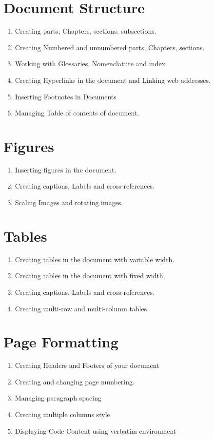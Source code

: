 \documentclass[11pt,a4paper]{article}
\begin{document}
 \section{Document Structure}
 \begin{enumerate}
 \item Creating parts, Chapters, sections, subsections.
 \item Creating Numbered and unnumbered parts, Chapters, sections.
 \item Working with Glossaries, Nomenclature and index
 \item Creating Hyperlinks in the document and Linking web addresses.
 \item Inserting Footnotes in Documents
 \item Managing Table of contents of document.
 \end{enumerate}
\section{Figures}
 \begin{enumerate}
 \item Inserting figures in the document.
 \item Creating captions, Labels and cross-references.
 \item Scaling Images and rotating images.
 \end{enumerate}
 
 \section{Tables}
  \begin{enumerate}
  \item Creating tables in the document with variable width.
   \item Creating tables in the document with fixed width.
  \item Creating captions, Labels and cross-references.
  \item Creating multi-row and multi-column tables.
  \end{enumerate}

\section{Page Formatting}
 \begin{enumerate}
 \item Creating Headers and Footers of your document
 \item Creating and changing page numbering.
 \item Managing paragraph spacing 
 \item Creating multiple columns style
 \item Displaying Code Content using verbatim environment
 \end{enumerate}
\end{document}
